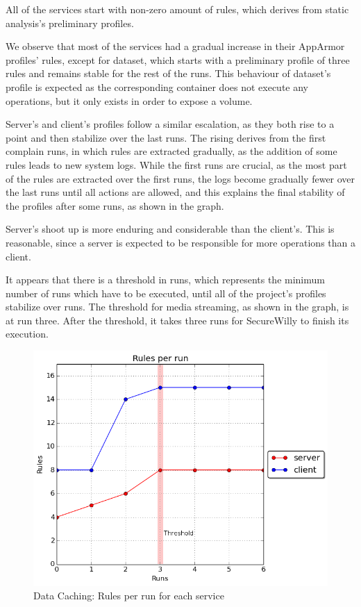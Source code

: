All of the services start with non-zero amount of rules, which derives from static analysis's preliminary profiles.

We observe that most of the services had a gradual increase in their AppArmor profiles' rules, except for dataset, which starts with a preliminary profile of three rules and remains stable for the rest of the runs. This behaviour of dataset's profile is expected as the corresponding container does not execute any operations, but it only exists in order to expose a volume.

Server's and client's profiles follow a similar escalation, as they both rise to a point and then stabilize over the last runs. The rising derives from the first complain runs, in which rules are extracted gradually, as the addition of some rules leads to new system logs. While the first runs are crucial, as the most part of the rules are extracted over the first runs, the logs become gradually fewer over the last runs until all actions are allowed, and this explains the final stability of the profiles after some runs, as shown in the graph.

Server's shoot up is more enduring and considerable than the client's. This is reasonable, since a server is expected to be responsible for more operations than a client.  

It appears that there is a threshold in runs, which represents the minimum number of runs which have to be executed, until all of the project's profiles stabilize over runs. The threshold for media streaming, as shown in the graph, is at run three. After the threshold, it takes three runs for SecureWilly to finish its execution.

\begin{figure}[h!]
  \centering
   \includegraphics[width=0.70\linewidth]{figures/datacaching/rulesthreshold.png}
   \caption{Data Caching: Rules per run for each service}
\end{figure}

